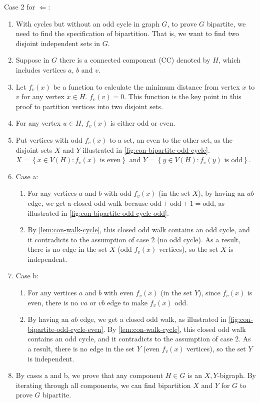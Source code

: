 \documentclass[../src/handouts/main.tex]{subfiles}
\begin{document}
Case 2 for $\Leftarrow$:
\begin{enumerate}
  \item With cycles but without an odd cycle in graph $G$, to prove $G$ bipartite, we need to find the specification of bipartition. That is, we want to find two disjoint independent sets in $G$.
  \item Suppose in $G$ there is a connected component (CC) denoted by $H$, which includes vertices $a$, $b$ and $v$.
  \item Let $f_v(x)$ be a function to calculate the minimum distance from vertex $x$ to $v$ for any vertex $x \in H$. $f_v(v) = 0$. This function is the key point in this proof to partition vertices into two disjoint sets.
  \item For any vertex $u \in H$, $f_v(x)$ is either odd or even.
  \item Put vertices with odd $f_v(x)$ to a set, an even to the other set, as the disjoint sets $X$ and $Y$ illustrated in \cref{fig:con-bipartite-odd-cycle}. $X = \left\{x \in V(H): f_v(x) \text{ is even} \right\}$ and $Y = \left\{y \in V(H): f_v(y) \text{ is odd} \right\}$.
  \item Case a:
        \begin{enumerate}
          \item For any vertices $a$ and $b$ with odd $f_v(x)$ (in the set $X$), by having an $ab$ edge, we get a closed odd walk because $\text{odd} + \text{odd} + 1 = \text{odd}$, as illustrated in \cref{fig:con-bipartite-odd-cycle-odd}.
          \item By \cref{lem:con-walk-cycle}, this closed odd walk contains an odd cycle, and it contradicts to the assumption of case 2 (no odd cycle). As a result, there is no edge in the set $X$ (odd $f_v(x)$ vertices), so the set $X$ is independent.
        \end{enumerate}

  \item Case b:
        \begin{enumerate}
          \item For any vertices $a$ and $b$ with even $f_v(x)$ (in the set $Y$), since $f_v(x)$ is even, there is no $va$ or $vb$ edge to make $f_v(x)$ odd.
          \item By having an $ab$ edge, we get a closed odd walk, as illustrated in \cref{fig:con-bipartite-odd-cycle-even}. By \cref{lem:con-walk-cycle}, this closed odd walk contains an odd cycle, and it contradicts to the assumption of case 2. As a result, there is no edge in the set $Y$ (even $f_v(x)$ vertices), so the set $Y$ is independent.
        \end{enumerate}

  \item By cases a and b, we prove that any component $H \in G$ is an $X,Y$-bigraph. By iterating through all components, we can find bipartition $X$ and $Y$ for $G$ to prove $G$ bipartite.
\end{enumerate}
\end{document}
